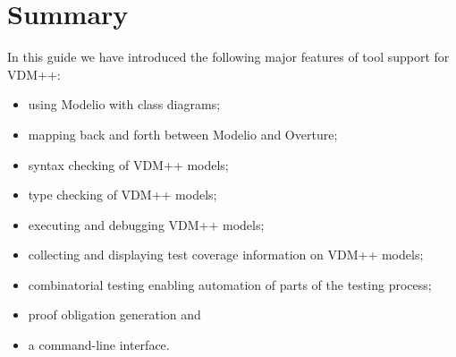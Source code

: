 \lstset{style=mystyle,language=VDM++}
%
\section{Summary}\label{sec:toolintrosummary}
In this guide we have introduced the following major features of tool support for VDM++:
%
\begin{itemize}
\item using Modelio with class diagrams;
\item mapping back and forth between Modelio and Overture;
\item syntax checking of VDM++ models;
\item type checking of VDM++ models;
\item executing and debugging VDM++ models;
\item collecting and displaying test coverage information on VDM++ models;
\item combinatorial testing enabling automation of parts of the testing process;
\item proof obligation generation and
\item a command-line interface.
\end{itemize}
